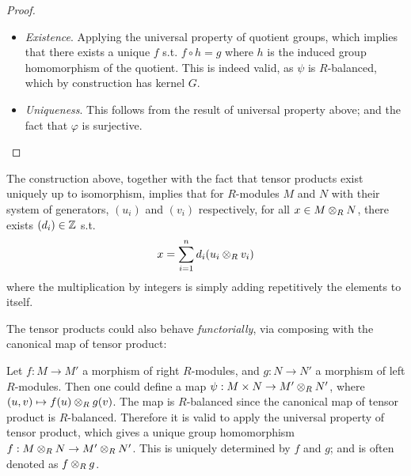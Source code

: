 \begin{proof}
    \begin{minipage}{\linewidth}
        \centering
    \end{minipage}
    \begin{itemize}
        \item \emph{Existence}. Applying the universal property of quotient groups, which implies that there exists a unique $f$ s.t. $f \circ h = g$ where $h$ is the induced group homomorphism of the quotient. This is indeed valid, as $\psi$ is $R$-balanced, which by construction has kernel $G$.
        \item \emph{Uniqueness}. This follows from the result of universal property above; and the fact that $\varphi$ is surjective.
    \end{itemize}
\end{proof}

\begin{remark}\label{Rmk:decomp of tensor}
    The construction above, together with the fact that tensor products exist uniquely up to isomorphism, implies that for $R$-modules $M$ and $N$ with their system of generators, $(u_i)$ and $(v_i)$ respectively, for all $x \in M \otimes_R N$, there exists $(d_i) \in \mathbb{Z}$ s.t.
    \[
        x = \sum\limits_{i=1}^n d_i (u_i \otimes_R v_i)
    \]
    where the multiplication by integers is simply adding repetitively the elements to itself.
\end{remark}

The tensor products could also behave \emph{functorially}, via composing with the canonical map of tensor product:

Let $f: M \to M'$ a morphism of right $R$-modules, and $g: N \to N'$ a morphism of left $R$-modules. Then one could define a map $\psi: M \times N \to M' \otimes_R N'$, where $(u, v) \mapsto f(u) \otimes_R g(v)$. The map is $R$-balanced since the canonical map of tensor product is $R$-balanced. Therefore it is valid to apply the universal property of tensor product, which gives a unique group homomorphism $f: M \otimes_R N \to M' \otimes_R N' $. This is uniquely determined by $f$ and $g$; and is often denoted as $f \otimes_R g$. 

